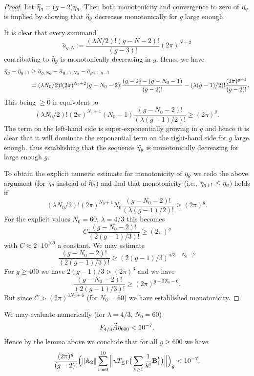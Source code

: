 \documentclass[12pt]{amsart}
\theoremstyle{definition}
\numberwithin{equation}{section}
\renewcommand{\tilde}{\widetilde}
\newcommand{\bB}{\mathbf{B}}
\newcommand{\numcheck}[1]{\cite[Computation #1]{SupplementaryNotebook}}
\theoremstyle{definition} %
\theoremstyle{remark}
\begin{document}
\begin{proof}
Let $\tilde \eb_g=(g-2) \eb_g$. Then both monotonicity and convergence to zero of $\eta_g$ is implied by showing that $\tilde \eb_g$ decreases monotonically for $g$ large enough. 

It is clear that every summand 
\[
    \tilde a_{g,N}:=\frac{(\lambda N/2)!(g-N-2)!}{(g-3)!}(2\pi)^{N+2}
\]
contributing to $\tilde \eb_g$ is monotonically decreasing in $g$.
Hence we have 
\begin{align*}
\tilde \eb_g - \tilde \eb_{g+1}&\geq \tilde a_{g,N_0} - \tilde a_{g+1,N_0}-\tilde a_{g+1,g-1}
\\&=
(\lambda N_0/2)!(2\pi)^{N_0+2} (g-N_0-2)!\frac{(g-2)-(g-N_0-1)}{(g-2)!} - (\lambda(g-1)/2)! \frac{(2\pi)^{g+1}}{(g-2)!}.
\end{align*}
This being $\geq 0$ is equivalent to 
\[
 (\lambda N_0/2)!(2\pi)^{N_0+1}(N_0-1)
 \frac{(g-N_0-2)!}{(\lambda(g-1)/2)!} \geq  (2\pi)^{g}.
\]
The term on the left-hand side is super-exponentially growing in $g$ and hence it is clear that it will dominate the exponential term on the right-hand side for $g$ large enough, thus establishing that 
the sequence $\tilde \eb_g$ is
monotonically decreasing for large enough $g$.

To obtain the explicit numeric estimate for monotonicity of $\eta_g$ we redo the above argument (for $\eta_g$ instead of $\tilde \eb_g$) and find that monotonicity (i.e., $\eta_{g+1}\leq \eta_g$) holds if 
\[
 (\lambda N_0/2)!(2\pi)^{N_0+1}N_0
 \frac{(g-N_0-2)!}{(\lambda(g-1)/2)!} \geq  (2\pi)^{g}.
\] 
For the explicit values $N_0=60$, $\lambda=4/3$ this becomes 
\[
C \frac{(g-N_0-2)!}{(2(g-1)/3)!} \geq  (2\pi)^{g}
\]
with $C\approx 2\cdot 10^{169}$ a constant.
We may estimate 
\[
    \frac{(g-N_0-2)!}{(2(g-1)/3)!} \geq (2(g-1)/3)^{g/3 -N_0-2}
\]
For $g\geq 400$ we have $2(g-1)/3>(2\pi)^3$ and we have 
\[
    \frac{(g-N_0-2)!}{(2(g-1)/3)!} \geq (2\pi)^{g-3N_0-6}.
\]
But since $C>(2\pi)^{3N_0+6}$ (for $N_0=60$) we have established monotonicity.
\end{proof}

We may evaluate numerically (for $\lambda=4/3$, $N_0=60$) \numcheck{X3EVAL}
\[
F_{4/3} \tilde A \eb_{600} < 10^{-7}.
\]
Hence by the lemma above we conclude that for all $g\geq 600$
we have 
\[
    \frac{(2\pi)^g}{(g-2)!}
    \Big(\|\bbA_2\| 
       \sum_{\Gamma=0}^{10}
       \Big\|uT_{\leq \Gamma}\big(\sum_{k\geq 1}\frac 1 {k!} \bB_1^k\big) \Big\|\Big)_{g}
     < 10^{-7}.
\]
\end{document}
